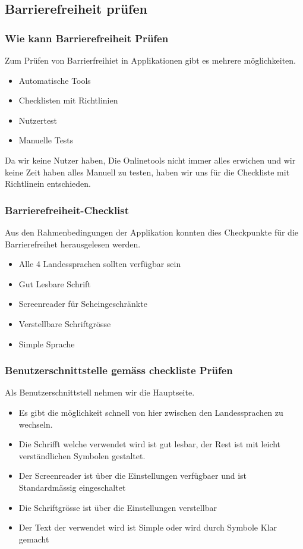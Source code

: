 \documentclass[10pt]{article}
\begin{document}
	\subsection{Barrierefreiheit prüfen}
	\subsubsection{Wie kann Barrierefreiheit Prüfen}
	Zum Prüfen von Barrierfreihiet in Applikationen gibt es mehrere möglichkeiten.
	\begin{itemize}
		\item Automatische Tools
		\item Checklisten mit Richtlinien
		\item Nutzertest
		\item Manuelle Tests
	\end{itemize}
	Da wir keine Nutzer haben, Die Onlinetools nicht immer alles erwichen und wir keine Zeit haben alles Manuell zu testen, haben wir uns für die Checkliste mit Richtlinein entschieden.
	\subsubsection{Barrierefreiheit-Checklist}
	Aus den Rahmenbedingungen der Applikation konnten dies Checkpunkte für die Barrierefreihet herausgelesen werden.
	\begin{itemize}
		\item Alle 4 Landessprachen sollten verfügbar sein
		\item Gut Lesbare Schrift
		\item Screenreader für Seheingeschränkte
		\item Verstellbare Schriftgrösse
		\item Simple Sprache
	\end{itemize}
	\subsubsection{Benutzerschnittstelle gemäss checkliste Prüfen}
	Als Benutzerschnittstell nehmen wir die Hauptseite.
	\begin{itemize}
		\item Es gibt die möglichkeit schnell von hier zwischen den Landessprachen zu wechseln.
		\item Die Schrifft welche verwendet wird ist gut lesbar, der Rest ist mit leicht verständlichen Symbolen gestaltet.
		\item Der Screenreader ist über die Einstellungen verfügbaer und ist Standardmässig eingeschaltet
		\item Die Schriftgrösse ist über die  Einstellungen verstellbar
		\item Der Text der verwendet wird ist Simple oder wird durch Symbole Klar gemacht
	\end{itemize}
	
\end{document}
